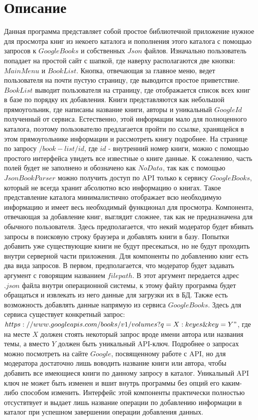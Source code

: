 \section*{Описание}
Данная программа представляет собой простое библиотечной приложение нужное для просмотра книг из некоего каталога и пополнения этого каталога с помощью запросов к $Google Books$ и собственных $Json$ файлов. Изначально пользователь попадает на простой сайт с шапкой, где наверху располагаются две кнопки: $Main Menu$ и $Book List$. Кнопка, отвечающая за главное меню, ведет пользователя на почти пустую страницу, где выводится простое приветствие. $Book List$ выводит пользователя на страницу, где отображается список всех книг в базе по порядку их добавления. Книги представляются как небольшой прямоугольник, где написаны название книги, авторы и уникальный $Google Id$ полученный от сервиса. Естественно, этой информации мало для полноценного каталога, поэтому пользователю предлагается пройти по ссылке, хранящейся в этом прямоугольнике информации и рассмотреть книгу подробнее. На странице по запросу $/book-list/{id}$, где $id$ - внутренний номер книги, можно с помощью простого интерфейса увидеть все известные о книге данные. К сожалению, часть полей будет не заполнено и обозначено как $No Data$, так как с помощью $JsonBookParser$ можно получить доступ по API только к сервису $Google Books$, который не всегда хранит абсолютно всю информацию о книгах. Такое представление каталога минималистично отображает всю необходимую информацию и имеет весь необходимый функционал для просмотра. Компонента, отвечающая за добавление книг, выглядит сложнее, так как не предназначена для обычного пользователя. Здесь предполагается, что некий модератор будет вбивать запросы в поисковую строку браузера и добавлять книги в базу. Попытки добавить уже существующие книги не будут пресекаться, но не будут проходить внутри серверной части приложения. Для компоненты по добавлению книг есть два вида запросов. В первом, предполагается, что модератор будет задавать аргумент с говорящим названием $filepath$. В этот аргумент передается адрес $.json$ файла внутри операционной системы, к этому файлу программа будет обращаться и извлекать из него данные для загрузки их в БД. Также есть возможность добавлять данные напрямую из сервиса $Google Books$. Здесь для сервиса существует конкретный запрос: $https://www.googleapis.com/books/v1/volumes?q=X:keyes\&key=Y"$, где на месте $X$ должен стоять некоторый запрос вроде имени автора или названия темы, а вместо $Y$ должен быть уникальный API-ключ. Подробнее о запросах можно посмотреть на сайте $Google$, посвященному работе с API, но для модератора достаточно лишь воводить название книги или автора, чтобы добавить все имеющиеся книги по данному запросу в каталог. Уникальный API ключ не может быть изменен и вшит внутрь программы без опций его каким-либо способом изменить. Интерфейс этой компоненты практически полностью отсуствтвует и выдает лишь название операции по добавлению информации в каталог при успешном завершении операции добавления данных.
